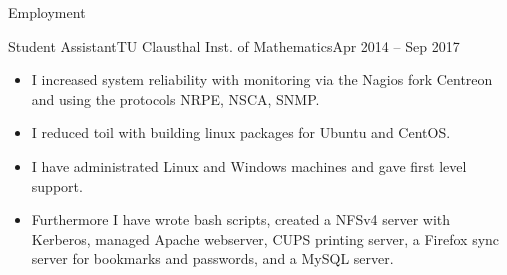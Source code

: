 \documentclass[]{mcdowellcv}
\begin{document}
\begin{cvsection}{Employment}
\begin{cvsubsection}{Student Assistant}{TU Clausthal Inst. of Mathematics}{Apr 2014 -- Sep 2017}
\bigskip
\begin{itemize}
\item I increased system reliability with monitoring via the Nagios fork Centreon and using the protocols NRPE, NSCA, SNMP.
\item I reduced toil with building linux packages for Ubuntu and CentOS.
\item I have administrated Linux and Windows machines and gave first level support.
\item Furthermore I have wrote bash scripts, created a NFSv4 server with Kerberos, managed Apache webserver, CUPS printing server, a Firefox sync server for bookmarks and passwords, and a MySQL server.
\end{itemize}
\end{cvsubsection}

\end{cvsection}
\end{document}
